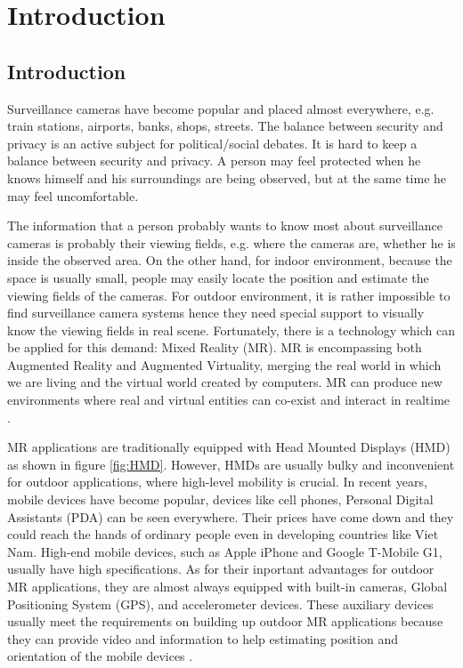 \chapter{Introduction}
\label{Chapter1}


\section{Introduction}

Surveillance cameras have become popular and placed almost everywhere, e.g. train stations, airports, banks, shops, streets. The balance between security and privacy is an active subject for political/social debates. It is hard to keep a balance between security and privacy. A person may feel protected when he knows himself and his surroundings are being observed, but at the same time he may feel uncomfortable.

The information that a person probably wants to know most about surveillance cameras is probably their viewing fields, e.g. where the cameras are, whether he is inside the observed area. On the other hand, for indoor environment, because the space is usually small, people may easily locate the position and estimate the viewing fields of the cameras. For outdoor environment, it is rather impossible to find surveillance camera systems hence they need special support to visually know the viewing fields in real scene. Fortunately, there is a technology which can be applied for this demand: Mixed Reality (MR). MR is encompassing both Augmented Reality and Augmented Virtuality, merging the real world in which we are living and the virtual world created by computers. MR can produce new environments where real and virtual entities can co-exist and interact in realtime \cite{Reference3}.

MR applications are traditionally equipped with Head Mounted Displays (HMD) as shown in figure \ref{fig:HMD}. However, HMDs are usually bulky and inconvenient for outdoor applications, where high-level mobility is crucial. In recent years, mobile devices have become popular, devices like cell phones, Personal Digital Assistants (PDA) can be seen everywhere. Their prices have come down and they could reach the hands of ordinary people even in developing countries like Viet Nam. High-end mobile devices, such as Apple iPhone and Google T-Mobile G1, usually have high specifications. As for their inportant advantages for outdoor MR applications, they are almost always equipped with built-in cameras, Global Positioning System (GPS), and accelerometer devices. These auxiliary devices usually meet the requirements on building up outdoor MR applications because they can provide video and information to help estimating position and orientation of the mobile devices \cite{Reference2} \cite{Reference4}.

